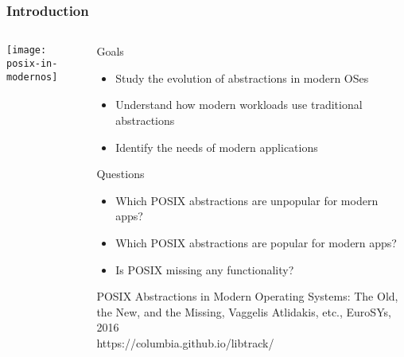 \begin{frame}[plain]
	\frametitle{Introduction}
	
	
	\begin{columns}
	
	\begin{column}{.4\textwidth}	

			\centering
			\texttt{[image: posix-in-modernos]}


		\end{column}



\begin{column}{.6\textwidth}	
	\large
			Goals
			\begin{itemize}\normalsize
				\item Study the evolution of abstractions in modern OSes
				\item Understand how modern workloads use traditional abstractions
				\item  Identify the needs of modern applications
			\end{itemize}
		
			\large
			Questions
			\begin{itemize}\normalsize
				\item Which POSIX abstractions are unpopular for modern apps?
				\item  Which POSIX abstractions are popular for modern apps?				
				\item  Is POSIX missing any functionality?
				
			\end{itemize}
			
			\tiny POSIX Abstractions in Modern Operating
			Systems: The Old, the New, and the Missing, Vaggelis Atlidakis, etc., EuroSYs, 2016
			\\
			https://columbia.github.io/libtrack/
		\end{column}


\end{columns}

	
\end{frame}	


